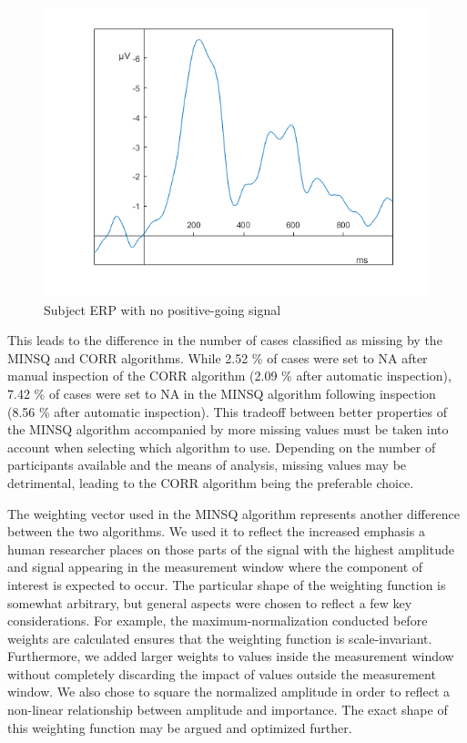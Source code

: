 \documentclass[
  man]{apa7}
\begin{document}
\begin{figure}
\includegraphics[width=0.75\linewidth]{images/only_negative_signal_example} \caption{Subject ERP with no positive-going signal}\label{fig:only-negative-example}
\end{figure}

This leads to the difference in the number of cases classified as missing by the MINSQ and CORR algorithms. While 2.52 \% of cases were set to NA after manual inspection of the CORR algorithm (2.09 \% after automatic inspection), 7.42 \% of cases were set to NA in the MINSQ algorithm following inspection (8.56 \% after automatic inspection). This tradeoff between better properties of the MINSQ algorithm accompanied by more missing values must be taken into account when selecting which algorithm to use. Depending on the number of participants available and the means of analysis, missing values may be detrimental, leading to the CORR algorithm being the preferable choice.

The weighting vector used in the MINSQ algorithm represents another difference between the two algorithms. We used it to reflect the increased emphasis a human researcher places on those parts of the signal with the highest amplitude and signal appearing in the measurement window where the component of interest is expected to occur. The particular shape of the weighting function is somewhat arbitrary, but general aspects were chosen to reflect a few key considerations. For example, the maximum-normalization conducted before weights are calculated ensures that the weighting function is scale-invariant. Furthermore, we added larger weights to values inside the measurement window without completely discarding the impact of values outside the measurement window. We also chose to square the normalized amplitude in order to reflect a non-linear relationship between amplitude and importance. The exact shape of this weighting function may be argued and optimized further.
\end{document}
